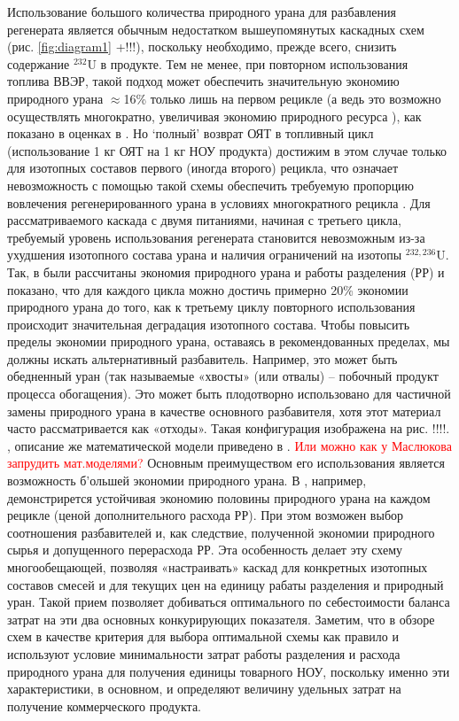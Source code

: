 Использование большого количества природного урана для разбавления регенерата является обычным недостатком вышеупомянутых каскадных схем (рис. \ref{fig:diagram1} +!!!), поскольку необходимо, прежде всего, снизить содержание $^{232}$U в продукте. Тем не менее, при повторном использования топлива ВВЭР, такой подход может обеспечить значительную экономию природного урана $\approx$16\% только лишь на первом рецикле (а ведь это возможно осуществлять многократно, увеличивая экономию природного ресурса \cite{colemanEvaluationMultipleSelfrecycling2010}), как показано в оценках в \cite{smirnovEvolutionIsotopicComposition2012}. Но `полный' возврат ОЯТ в топливный цикл (использование 1 кг ОЯТ на 1 кг НОУ продукта) достижим в этом случае только для изотопных составов первого (иногда второго) рецикла, что означает невозможность с помощью такой схемы обеспечить требуемую пропорцию вовлечения регенерированного урана в условиях многократного рецикла \cite{smirnovApplyingEnrichmentCapacities2018}.
Для рассматриваемого каскада с двумя питаниями, начиная с третьего цикла, требуемый уровень использования регенерата становится невозможным из-за ухудшения изотопного состава урана и наличия ограничений на изотопы $^{232,236}$U.
Так, в \cite{smirnovApplyingEnrichmentCapacities2018} были рассчитаны экономия природного урана и работы разделения (РР) и показано, что для каждого цикла можно достичь примерно 20\% экономии природного урана до того, как к третьему циклу повторного использования происходит значительная деградация изотопного состава.
Чтобы повысить пределы экономии природного урана, оставаясь в рекомендованных пределах, мы должны искать альтернативный разбавитель. Например, это может быть обедненный уран (так называемые «хвосты» (или отвалы) -- побочный продукт процесса обогащения). Это может быть плодотворно использовано для частичной замены природного урана в качестве основного разбавителя, хотя этот материал часто рассматривается как «отходы». Такая конфигурация изображена на рис. !!!!. , описание же математической модели приведено в \cite{smirnovEnrichmentRegeneratedUranium2014}.
\textcolor{red}{Или можно как у Маслюкова запрудить мат.моделями?}
Основным преимуществом его использования является возможность б'ольшей экономии природного урана. В \cite{smirnovApplyingEnrichmentCapacities2018}, например, демонстрирется устойчивая экономию половины природного урана на каждом рецикле (ценой дополнительного расхода РР). При этом возможен выбор соотношения разбавителей и, как следствие, полученной экономии природного сырья и допущенного перерасхода РР. Эта особенность делает эту схему многообещающей, позволяя «настраивать» каскад для конкретных изотопных составов смесей и для текущих цен на единицу рабаты разделения и природный уран. Такой прием позволяет добиваться оптимального по себестоимости баланса затрат на эти два основных конкурирующих показателя. Заметим, что в обзоре схем в качестве критерия для выбора оптимальной схемы как правило и используют условие минимальности затрат работы разделения и расхода природного урана для получения единицы товарного НОУ, поскольку именно эти характеристики, в основном, и определяют величину удельных затрат на получение коммерческого продукта.


